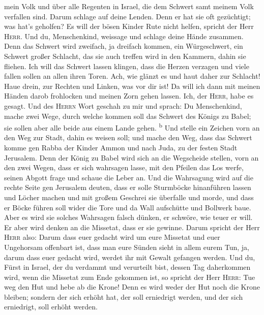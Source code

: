 mein Volk und über alle Regenten in Israel, die dem Schwert samt meinem
Volk verfallen sind. Darum schlage auf deine Lenden. 
Denn er hat sie oft gezüchtigt; was hat's geholfen? Es will der bösen
Kinder Rute nicht helfen, spricht der Herr \textsc{Herr}.
 Und du, Menschenkind, weissage und schlage deine Hände
zusammen. Denn das Schwert wird zweifach, ja dreifach kommen, ein
Würgeschwert, ein Schwert großer Schlacht, das sie auch treffen wird in
den Kammern, dahin sie fliehen.  Ich will das Schwert
lassen klingen, dass die Herzen verzagen und viele fallen sollen an
allen ihren Toren. Ach, wie glänzt es und haut daher zur Schlacht!
 Haue drein, zur Rechten und Linken, was vor dir ist!
 Da will ich dann mit meinen Händen darob frohlocken und
meinen Zorn gehen lassen. Ich, der \textsc{Herr}, habe es gesagt.
 Und des \textsc{Herrn} Wort geschah zu mir und sprach:
 Du Menschenkind, mache zwei Wege, durch welche kommen
soll das Schwert des Königs zu Babel; sie sollen aber alle beide aus
einem Lande gehen. \textsuperscript{b}  Und stelle ein
Zeichen vorn an den Weg zur Stadt, dahin es weisen soll; und mache den
Weg, dass das Schwert komme gen Rabba der Kinder Ammon und nach Juda, zu
der festen Stadt Jerusalem.  Denn der König zu Babel wird
sich an die Wegscheide stellen, vorn an den zwei Wegen, dass er sich
wahrsagen lasse, mit den Pfeilen das Los werfe, seinen Abgott frage und
schaue die Leber an.  Und die Wahrsagung wird auf die
rechte Seite gen Jerusalem deuten, dass er solle Sturmböcke hinanführen
lassen und Löcher machen und mit großem Geschrei sie überfalle und
morde, und dass er Böcke führen soll wider die Tore und da Wall
aufschütte und Bollwerk baue.  Aber es wird sie solches
Wahrsagen falsch dünken, er schwöre, wie teuer er will. Er aber wird
denken an die Missetat, dass er sie gewinne.  Darum
spricht der Herr \textsc{Herr} also: Darum dass euer gedacht wird um
eure Missetat und euer Ungehorsam offenbart ist, dass man eure Sünden
sieht in allem eurem Tun, ja, darum dass euer gedacht wird, werdet ihr
mit Gewalt gefangen werden.  Und du, Fürst in Israel, der
du verdammt und verurteilt bist, dessen Tag daherkommen wird, wenn die
Missetat zum Ende gekommen ist,  so spricht der Herr
\textsc{Herr}: Tue weg den Hut und hebe ab die Krone! Denn es wird weder
der Hut noch die Krone bleiben; sondern der sich erhöht hat, der soll
erniedrigt werden, und der sich erniedrigt, soll erhöht werden.

